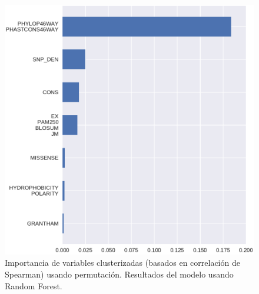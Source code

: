 \begin{figure}[H]
    \centering
    \includegraphics[scale=0.6]{documents/latex/figures/3/integral/integral_importance_cluster.pdf}
    \caption{Importancia de variables clusterizadas (basados en correlación de Spearman) usando permutación. Resultados del modelo usando Random Forest.}
    \label{fig:importance_cluster_integral_rf}
\end{figure}



